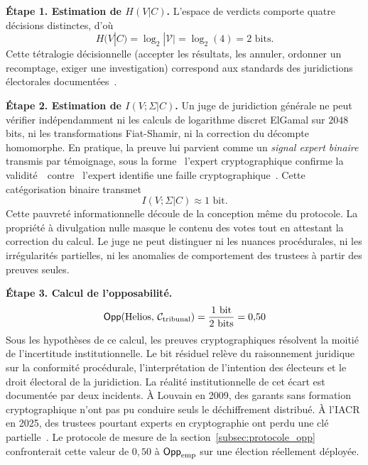 \begin{sloppypar}
\noindent\textbf{\'Etape 1. Estimation de $H(V|C)$.} L'espace de verdicts
comporte quatre d\'ecisions distinctes, d'o\`u
\begin{equation}
H(V|C) = \log_2|\mathcal{V}| = \log_2(4) = 2 \text{ bits}.
\label{eq:hvc_helios}
\end{equation}
Cette t\'etralogie d\'ecisionnelle (accepter les r\'esultats, les annuler,
ordonner un recomptage, exiger une investigation) correspond aux standards
des juridictions \'electorales document\'ees~\cite{MINKA2026CLO}.

\noindent\textbf{\'Etape 2. Estimation de $I(V;\Sigma|C)$.} Un juge de
juridiction g\'en\'erale ne peut v\'erifier ind\'ependamment ni les calculs de
logarithme discret ElGamal sur $2048$ bits, ni les transformations
Fiat-Shamir, ni la correction du d\'ecompte homomorphe. En pratique, la preuve
lui parvient comme un \emph{signal expert binaire} transmis par
t\'emoignage, sous la forme \guillemotleft~l'expert cryptographique confirme la
validit\'e~\guillemotright~contre \guillemotleft~l'expert identifie une faille
cryptographique~\guillemotright. Cette cat\'egorisation binaire transmet
\begin{equation}
I(V;\Sigma|C) \approx 1 \text{ bit}.
\label{eq:ivc_helios}
\end{equation}
Cette pauvret\'e informationnelle d\'ecoule de la conception m\^eme du protocole.
La propri\'et\'e \`a divulgation nulle masque le contenu des votes tout en
attestant la correction du calcul. Le juge ne peut
distinguer ni les nuances proc\'edurales, ni les irr\'egularit\'es partielles, ni
les anomalies de comportement des trustees \`a partir des preuves seules.

\noindent\textbf{\'Etape 3. Calcul de l'opposabilit\'e.}
\begin{equation}
\mathsf{Opp}(\text{Helios},\, \mathcal{C}_{\text{tribunal}})
= \frac{1 \text{ bit}}{2 \text{ bits}} = 0{,}50
\label{eq:opp_helios}
\end{equation}
Sous les hypoth\`eses de ce calcul, les preuves cryptographiques r\'esolvent la
moiti\'e de l'incertitude institutionnelle. Le bit r\'esiduel rel\`eve du raisonnement
juridique sur la conformit\'e proc\'edurale, l'interpr\'etation de l'intention
des \'electeurs et le droit \'electoral de la juridiction. La r\'ealit\'e
institutionnelle de cet \'ecart est document\'ee par deux incidents. \`A Louvain en 2009, des garants
sans formation cryptographique n'ont pas pu conduire seuls le d\'echiffrement distribu\'e. \`A l'IACR
en 2025, des trustees pourtant experts en cryptographie ont perdu une cl\'e
partielle~\cite{MINKA2026CLO}. Le protocole de mesure de la
section~\ref{subsec:protocole_opp} confronterait cette valeur de $0{,}50$ \`a
$\mathsf{Opp}_{\mathrm{emp}}$ sur une \'election r\'eellement d\'eploy\'ee.


\end{sloppypar}
